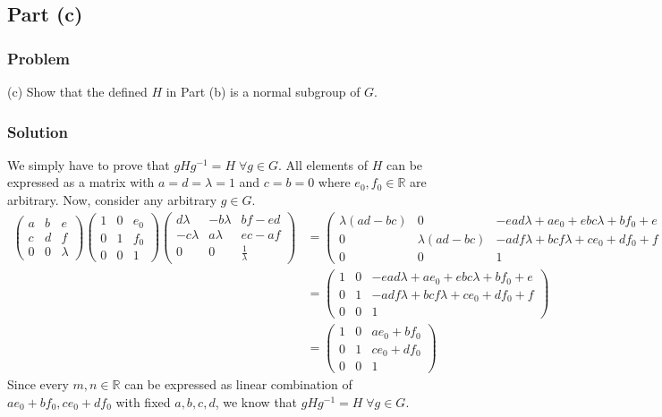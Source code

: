 \subsection{Part (c)}
\subsubsection{Problem}
(c) Show that the defined $H$ in Part (b) is a normal subgroup of $G$.
\subsubsection{Solution}

We simply have to prove that $gHg^{-1} = H\; \forall g \in G$. All elements of $H$ can be expressed as a matrix with $a=d=\lambda = 1$ and $c=b=0$ where $e_0,f_0 \in \mathbb{R}$ are arbitrary. Now, consider any arbitrary $g \in G$.
\begin{align*}
    \begin{pmatrix}
        a & b & e\\
        c & d & f\\
        0 & 0 & \lambda
    \end{pmatrix}
    \begin{pmatrix}
        1 & 0 & e_0 \\
        0 & 1 & f_0 \\
        0 & 0 & 1
    \end{pmatrix}
    \begin{pmatrix}
        d\lambda & -b\lambda & bf-ed\\
        -c\lambda & a\lambda & ec - af\\
        0 & 0 & \frac{1}{\lambda}
    \end{pmatrix} &= \begin{pmatrix}
        \lambda(ad-bc) & 0 & -ead\lambda + ae_0 + ebc\lambda + bf_0 + e\\
        0 & \lambda(ad-bc) & -adf\lambda + bcf\lambda + ce_0 + df_0 + f\\
        0 & 0 & 1
    \end{pmatrix}\\
    &= \begin{pmatrix}
        1 & 0 & -ead\lambda + ae_0 + ebc\lambda + bf_0 + e\\
        0 & 1 & -adf\lambda + bcf\lambda + ce_0 + df_0 + f\\
        0 & 0 & 1
    \end{pmatrix}\\
    &= \begin{pmatrix}
        1 & 0 & ae_0 + bf_0\\
        0 & 1 & ce_0 + df_0\\
        0 & 0 & 1
    \end{pmatrix}
\end{align*}
Since every $m,n \in \mathbb{R}$ can be expressed as linear combination of $ae_0 + bf_0, ce_0 + df_0$ with fixed $a,b,c,d$, we know that $gHg^{-1} = H \;\forall g \in G$.


